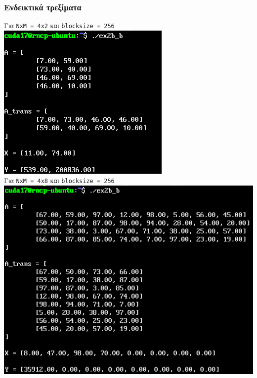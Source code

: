 \documentclass{article}
\begin{document}
\subsubsection{Ενδεικτικά τρεξίματα}

Για \lstinline{NxM = 4x2} και \lstinline{blocksize = 256} \\

\includegraphics[width=\textwidth]{res/ex2b_b_1.png} \\

Για \lstinline{NxM = 4x8} και \lstinline{blocksize = 256} \\

\includegraphics[width=\textwidth]{res/ex2b_b_2.png} \\
\end{document}
